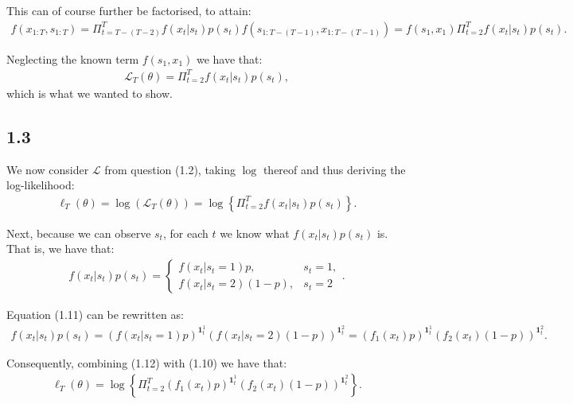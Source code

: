 \documentclass[11pt,a4paper,oneside]{article}
\newcommand{\lll}{\mathcal{L}}
\newcommand{\lp}{\left(}
\newcommand{\rp}{\right)}
\newcommand{\lc}{\left\{}
\newcommand{\rc}{\right\}}
\newcommand{\ii}{\mathbf{1}}
\begin{document}
This can of course further be factorised, to attain:
\begin{align}
    f\lp x_{1:T}, s_{1:T} \rp 
        = \Pi_{t=T-(T-2)}^T  f\lp x_t \vert s_t \rp p\lp s_t\rp f\lp s_{1:T - (T-1)}, x_{1:T - (T-1)}\rp 
        = f\lp s_1, x_1\rp \Pi_{t=2}^T  f\lp x_t \vert s_t \rp p\lp s_t\rp.
\end{align}

Neglecting the known term $f\lp s_1, x_1\rp$ we have that:
\begin{align}
    \lll_T\lp \theta\rp = \Pi_{t=2}^T  f\lp x_t \vert s_t \rp p\lp s_t\rp,
\end{align}
which is what we wanted to show.

\subsection{1.3}
We now consider $\lll$ from question (1.2), taking $\log$ thereof and thus deriving the log-likelihood:
\begin{align}
    \ell_T\lp \theta\rp = \log\lp \lll_T\lp \theta\rp\rp = \log\lc \Pi_{t=2}^T  f\lp x_t \vert s_t \rp p\lp s_t\rp\rc.
\end{align}

Next, because we can observe $s_t$, for each $t$ we know what $f\lp x_t \vert s_t\rp p\lp s_t\rp$ is. That is, we have that:
\begin{align}
    f\lp x_t \vert s_t\rp p\lp s_t\rp
        =
        \begin{cases}
            f\lp x_t \vert s_t = 1\rp p, & s_t = 1,\\
            f\lp x_t \vert s_t = 2\rp \lp 1 - p\rp, & s_t = 2
        \end{cases}.
\end{align}

Equation (1.11) can be rewritten as:
\begin{align}
    f\lp x_t \vert s_t\rp p\lp s_t\rp
        = \lp f\lp x_t \vert s_t = 1\rp p \rp^{\ii_t^1}
        \lp f\lp x_t \vert s_t = 2\rp \lp 1 - p \rp \rp^{\ii_t^2} = \lp f_1 \lp x_t\rp p\rp^{\ii_t^1}\lp f_2\lp x_t\rp \lp 1 - p\rp\rp^{\ii_t^2}.
\end{align}

Consequently, combining (1.12) with (1.10) we have that:
\begin{align}
    \ell_T\lp \theta\rp = \log\lc \Pi_{t=2}^T  \lp f_1 \lp x_t\rp p\rp^{\ii_t^1}\lp f_2\lp x_t\rp \lp 1 - p\rp\rp^{\ii_t^2}\rc.
\end{align}
\end{document}
